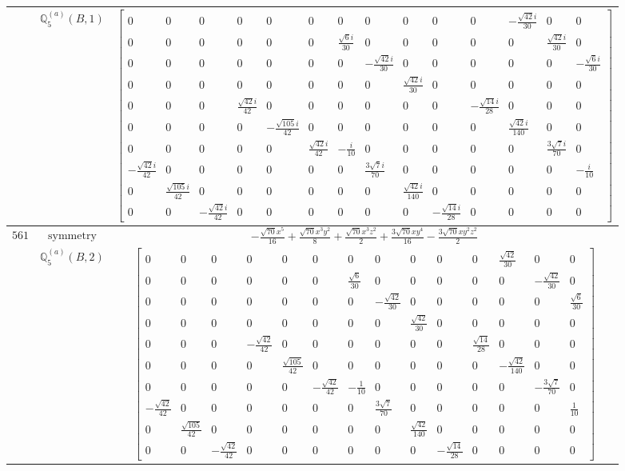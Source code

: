 \documentclass[fleqn,8pt,landscape]{jsarticle}
\begin{document}
\begin{longtable}{ccc}
$  $ & $ \mathbb{Q}_{5}^{(a)}(B,1) $ & $ \begin{bmatrix} 0 & 0 & 0 & 0 & 0 & 0 & 0 & 0 & 0 & 0 & 0 & - \frac{\sqrt{42} i}{30} & 0 & 0 \\ 0 & 0 & 0 & 0 & 0 & 0 & \frac{\sqrt{6} i}{30} & 0 & 0 & 0 & 0 & 0 & \frac{\sqrt{42} i}{30} & 0 \\ 0 & 0 & 0 & 0 & 0 & 0 & 0 & - \frac{\sqrt{42} i}{30} & 0 & 0 & 0 & 0 & 0 & - \frac{\sqrt{6} i}{30} \\ 0 & 0 & 0 & 0 & 0 & 0 & 0 & 0 & \frac{\sqrt{42} i}{30} & 0 & 0 & 0 & 0 & 0 \\ 0 & 0 & 0 & \frac{\sqrt{42} i}{42} & 0 & 0 & 0 & 0 & 0 & 0 & - \frac{\sqrt{14} i}{28} & 0 & 0 & 0 \\ 0 & 0 & 0 & 0 & - \frac{\sqrt{105} i}{42} & 0 & 0 & 0 & 0 & 0 & 0 & \frac{\sqrt{42} i}{140} & 0 & 0 \\ 0 & 0 & 0 & 0 & 0 & \frac{\sqrt{42} i}{42} & - \frac{i}{10} & 0 & 0 & 0 & 0 & 0 & \frac{3 \sqrt{7} i}{70} & 0 \\ - \frac{\sqrt{42} i}{42} & 0 & 0 & 0 & 0 & 0 & 0 & \frac{3 \sqrt{7} i}{70} & 0 & 0 & 0 & 0 & 0 & - \frac{i}{10} \\ 0 & \frac{\sqrt{105} i}{42} & 0 & 0 & 0 & 0 & 0 & 0 & \frac{\sqrt{42} i}{140} & 0 & 0 & 0 & 0 & 0 \\ 0 & 0 & - \frac{\sqrt{42} i}{42} & 0 & 0 & 0 & 0 & 0 & 0 & - \frac{\sqrt{14} i}{28} & 0 & 0 & 0 & 0 \end{bmatrix} $ \\ \hline
$ 561 $ & $ \text{symmetry} $ & $ - \frac{\sqrt{70} x^{5}}{16} + \frac{\sqrt{70} x^{3} y^{2}}{8} + \frac{\sqrt{70} x^{3} z^{2}}{2} + \frac{3 \sqrt{70} x y^{4}}{16} - \frac{3 \sqrt{70} x y^{2} z^{2}}{2} $ \\
$  $ & $ \mathbb{Q}_{5}^{(a)}(B,2) $ & $ \begin{bmatrix} 0 & 0 & 0 & 0 & 0 & 0 & 0 & 0 & 0 & 0 & 0 & \frac{\sqrt{42}}{30} & 0 & 0 \\ 0 & 0 & 0 & 0 & 0 & 0 & \frac{\sqrt{6}}{30} & 0 & 0 & 0 & 0 & 0 & - \frac{\sqrt{42}}{30} & 0 \\ 0 & 0 & 0 & 0 & 0 & 0 & 0 & - \frac{\sqrt{42}}{30} & 0 & 0 & 0 & 0 & 0 & \frac{\sqrt{6}}{30} \\ 0 & 0 & 0 & 0 & 0 & 0 & 0 & 0 & \frac{\sqrt{42}}{30} & 0 & 0 & 0 & 0 & 0 \\ 0 & 0 & 0 & - \frac{\sqrt{42}}{42} & 0 & 0 & 0 & 0 & 0 & 0 & \frac{\sqrt{14}}{28} & 0 & 0 & 0 \\ 0 & 0 & 0 & 0 & \frac{\sqrt{105}}{42} & 0 & 0 & 0 & 0 & 0 & 0 & - \frac{\sqrt{42}}{140} & 0 & 0 \\ 0 & 0 & 0 & 0 & 0 & - \frac{\sqrt{42}}{42} & - \frac{1}{10} & 0 & 0 & 0 & 0 & 0 & - \frac{3 \sqrt{7}}{70} & 0 \\ - \frac{\sqrt{42}}{42} & 0 & 0 & 0 & 0 & 0 & 0 & \frac{3 \sqrt{7}}{70} & 0 & 0 & 0 & 0 & 0 & \frac{1}{10} \\ 0 & \frac{\sqrt{105}}{42} & 0 & 0 & 0 & 0 & 0 & 0 & \frac{\sqrt{42}}{140} & 0 & 0 & 0 & 0 & 0 \\ 0 & 0 & - \frac{\sqrt{42}}{42} & 0 & 0 & 0 & 0 & 0 & 0 & - \frac{\sqrt{14}}{28} & 0 & 0 & 0 & 0 \end{bmatrix} $ \\ \hline

\end{longtable}
\end{document}
